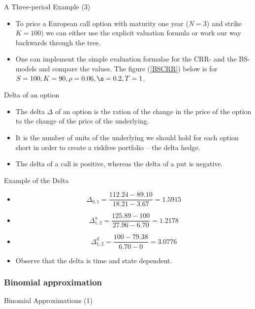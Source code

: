 { A Three-period Example (3)}
\begin{itemize}
\item To price a European call option with maturity one year ($N=3$) and
strike $K=100)$ we can either use the explicit valuation formula or work our way backwards through the tree.
\item One can implement the simple evaluation formulae for the CRR- and
the BS-models and compare the values. The figure (\ref{BSCRR}) below is for
$S=100, K=90, \rho=0.06, \s=0.2, T=1$.
\end{itemize}




{Delta  of an option}
\begin{itemize}
\item<1-> The delta $\Delta$ of an option is the ration of the change in the price of the option to the
change of the price of the underlying.
\item<2-> It is the number of units of the underlying we should hold for each option short in order to
create a riskfree portfolio -- the delta hedge.
\item<3-> The delta of a call is positive, whereas the delta of a put is negative.

\end{itemize}




{Example of the Delta}
\begin{itemize}
\item<1->
$$
\Delta_{0,1}=\frac{112.24-89.10}{18.21-3.67}=1.5915
$$
\item<2->
$$
\Delta^u_{1,2}=\frac{125.89-100}{27.96-6.70}=1.2178
$$
\item<3->
$$
\Delta^d_{1,2}=\frac{100-79.38}{6.70-0}=3.0776
$$
\item<4-> Observe that the delta is time and state dependent.
\end{itemize}




\subsubsection{Binomial approximation}


{Binomial Approximations (1)}

